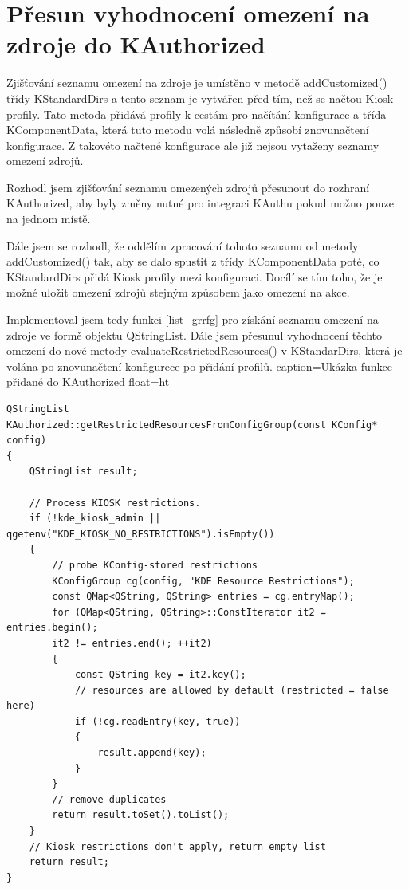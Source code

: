\section{Přesun vyhodnocení omezení na zdroje do KAuthorized}
Zjišťování seznamu omezení na zdroje je umístěno v metodě addCustomized() třídy
KStandardDirs a tento seznam je vytvářen před tím, než se načtou Kiosk profily.
Tato metoda přidává profily k cestám pro načítání konfigurace a třída
KComponentData, která tuto metodu volá následně způsobí znovunačtení
konfigurace. Z takovéto načtené konfigurace ale již nejsou vytaženy seznamy
omezení zdrojů.

Rozhodl jsem zjišťování seznamu omezených zdrojů přesunout do rozhraní
KAuthorized, aby byly změny nutné pro integraci KAuthu pokud možno pouze na
jednom místě.

Dále jsem se rozhodl, že oddělím zpracování tohoto seznamu od metody
addCustomized() tak, aby se dalo spustit z třídy KComponentData poté,
co KStandardDirs přidá Kiosk profily mezi konfiguraci. Docílí se tím toho, že
je možné uložit omezení zdrojů stejným způsobem jako omezení na akce.

Implementoval jsem tedy funkci \ref{list_grrfg} pro získání seznamu omezení na
zdroje ve formě objektu QStringList. Dále jsem přesunul vyhodnocení těchto
omezení do nové metody evaluateRestrictedResources() v KStandarDirs, která
je volána po znovunačtení konfigurece po přidání profilů.
\lstset
{
    caption=Ukázka funkce přidané do KAuthorized
    float=ht
}
\begin{lstlisting}
QStringList
KAuthorized::getRestrictedResourcesFromConfigGroup(const KConfig* config)
{
    QStringList result;

    // Process KIOSK restrictions.
    if (!kde_kiosk_admin || qgetenv("KDE_KIOSK_NO_RESTRICTIONS").isEmpty())
    {
        // probe KConfig-stored restrictions
        KConfigGroup cg(config, "KDE Resource Restrictions");
        const QMap<QString, QString> entries = cg.entryMap();
        for (QMap<QString, QString>::ConstIterator it2 = entries.begin();
        it2 != entries.end(); ++it2)
        {
            const QString key = it2.key();
            // resources are allowed by default (restricted = false here)
            if (!cg.readEntry(key, true))
            {
                result.append(key);
            }
        }
        // remove duplicates
        return result.toSet().toList();
    }
    // Kiosk restrictions don't apply, return empty list
    return result;
}
\end{lstlisting}

